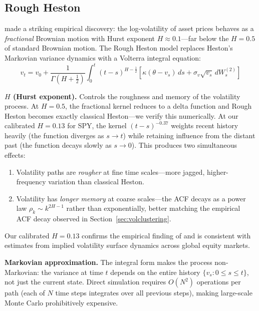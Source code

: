 \documentclass[11pt,a4paper]{article}
\begin{document}
\subsection{Rough Heston}
\label{sec:rough_heston}

\citet{gatheral2018} made a striking empirical discovery: the log-volatility of asset prices behaves as a \emph{fractional} Brownian motion with Hurst exponent $H \approx 0.1$---far below the $H = 0.5$ of standard Brownian motion.
The Rough Heston model replaces Heston's Markovian variance dynamics with a Volterra integral equation:
\begin{equation}
\label{eq:rough_heston}
v_t = v_0 + \frac{1}{\Gamma(H + \tfrac{1}{2})} \int_0^t (t-s)^{H-\frac{1}{2}} \left[\kappa(\theta - v_s)\,ds + \sigma_v \sqrt{v_s}\,dW_s^{(2)}\right]
\end{equation}

\textbf{$H$ (Hurst exponent).}
Controls the roughness and memory of the volatility process.
At $H = 0.5$, the fractional kernel reduces to a delta function and Rough Heston becomes exactly classical Heston---we verify this numerically.
At our calibrated $H = 0.13$ for SPY, the kernel $(t-s)^{-0.37}$ weights recent history heavily (the function diverges as $s \to t$) while retaining influence from the distant past (the function decays slowly as $s \to 0$).
This produces two simultaneous effects:
\begin{enumerate}[leftmargin=1.5em]
    \item Volatility paths are \emph{rougher} at fine time scales---more jagged, higher-frequency variation than classical Heston.
    \item Volatility has \emph{longer memory} at coarse scales---the ACF decays as a power law $\rho_k \sim k^{2H-1}$ rather than exponentially, better matching the empirical ACF decay observed in Section~\ref{sec:volclustering}.
\end{enumerate}
Our calibrated $H = 0.13$ confirms the empirical finding of \citet{gatheral2018} and is consistent with estimates from implied volatility surface dynamics across global equity markets.

\textbf{Markovian approximation.}
The integral form makes the process non-Markovian: the variance at time $t$ depends on the entire history $\{v_s : 0 \leq s \leq t\}$, not just the current state.
Direct simulation requires $O(N^2)$ operations per path (each of $N$ time steps integrates over all previous steps), making large-scale Monte Carlo prohibitively expensive.
\end{document}
